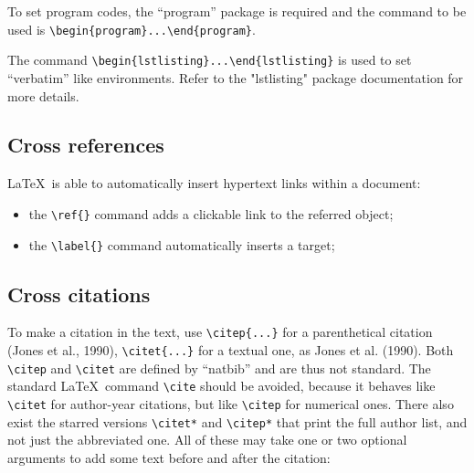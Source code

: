 \documentclass{article}
\begin{document}
To set program codes, the ``program'' package is required and the command to be used is \verb+\begin{program}...\end{program}+.

The command \verb+\begin{lstlisting}...\end{lstlisting}+ is used to set ``verbatim'' like environments. Refer to the "lstlisting" package documentation for more details.

\subsection{Cross references}

\LaTeX\ is able to automatically insert hypertext links within a document:

\begin{itemize}
\item the \verb+\ref{}+ command adds a clickable link to the referred object;
\item the \verb+\label{}+ command automatically inserts a target;
\end{itemize}

\subsection{Cross citations }
To make a citation in the text, use \verb+\citep{...}+ for a parenthetical citation (Jones et al., 1990), \verb+\citet{...}+ for a textual one, as Jones et al. (1990). Both \verb+\citep+ and \verb+\citet+ are defined by ``natbib'' and are thus not standard. The standard \LaTeX\ command \verb+\cite+ should be avoided, because it behaves like \verb+\citet+ for author-year citations, but like \verb+\citep+ for numerical ones. There also exist the starred versions \verb+\citet*+ and \verb+\citep*+ that print the full author list, and not just the abbreviated one. All of these may take one or two optional arguments to add some text before and after the citation:
\end{document}
